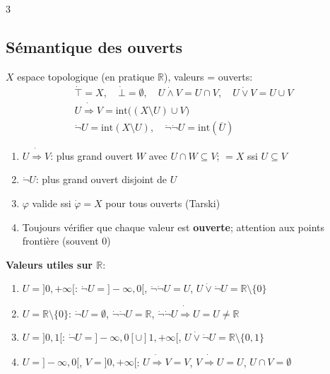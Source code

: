 \documentclass[12pt, a4paper]{article}
\providecommand{\R}{\mathbb{R}}
\begin{document}
\begin{multicols*}{3}
	\subsection{Sémantique des ouverts}
	$X$ espace topologique (en pratique $\R$), valeurs = ouverts:
	\begin{gather*}
		\dot\top=X,\quad\dot\bot=\emptyset,\quad U\dot\wedge V=U\cap V,\quad U\dot\vee V=U\cup V\\
		U\dot\Rightarrow V=\mathrm{int}\big((X\setminus U)\cup V\big)\\
		\dot\neg U=\mathrm{int}(X\setminus U),\quad\dot\neg\dot\neg U=\mathrm{int}(\overline U)
	\end{gather*}
	\begin{enumerate}[\roman*.]
		\item $U\dot\Rightarrow V$: plus grand ouvert $W$ avec $U\cap W\subseteq V$; $=X$ ssi $U\subseteq V$
		\item $\dot\neg U$: plus grand ouvert disjoint de $U$
		\item $\varphi$ valide ssi $\dot\varphi=X$ pour tous ouverts (Tarski)
		\item Toujours vérifier que chaque valeur est \textbf{ouverte}; attention aux points frontière (souvent 0)
	\end{enumerate}
	\textbf{Valeurs utiles sur $\R$}:
	\begin{enumerate}[\roman*.]
		\item $U=]0,+\infty[$: $\dot\neg U=]-\infty,0[$, $\dot\neg\dot\neg U=U$, $U\dot\vee\dot\neg U=\R\setminus\{0\}$
		\item $U=\R\setminus\{0\}$: $\dot\neg U=\emptyset$, $\dot\neg\dot\neg U=\R$, $\dot\neg\dot\neg U\dot\Rightarrow U=U\neq\R$
		\item $U=]0,1[$: $\dot\neg U=]-\infty,0[\cup]1,+\infty[$, $U\dot\vee\dot\neg U=\R\setminus\{0,1\}$
		\item $U=]-\infty,0[$, $V=]0,+\infty[$: $U\dot\Rightarrow V=V$, $V\dot\Rightarrow U=U$, $U\cap V=\emptyset$
	\end{enumerate}

	\colbreak

\end{multicols*}
\end{document}

